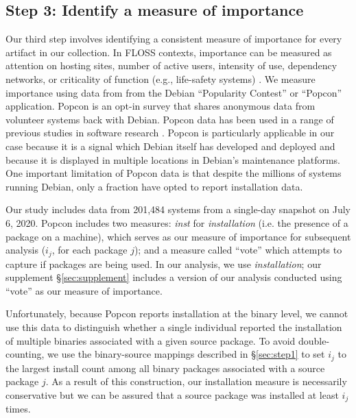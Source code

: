 \documentclass[10pt,conference]{IEEEtran}\usepackage[]{graphicx}\usepackage[usenames,dvipsnames]{color}
\begin{document}
\subsection{Step 3: Identify a measure of importance}
\label{sec:step3}

Our third step involves identifying a consistent measure of importance for every artifact in our collection.
In FLOSS contexts, importance can be measured as attention on hosting sites, number of active users, intensity of use, dependency networks, or criticality of function (e.g., life-safety systems) \cite{boldyreff_heartbeat:_2009, eghbal_working_2020, stergiopoulos_time-based_2016}.
We measure importance using data from from the Debian ``Popularity Contest'' or ``Popcon'' application. Popcon is an opt-in survey that shares anonymous data from volunteer systems back with Debian.  Popcon data has been used in a range of previous studies in software research \cite{boldyreff_heartbeat:_2009, herraiz_impact_2011, davies_perspectives_2010}. 
Popcon is particularly applicable in our case because it is a signal which Debian itself has developed and deployed and because it is displayed in multiple locations in Debian's maintenance platforms. 
One important limitation of Popcon data is that despite the millions of systems running Debian, only a fraction have opted to report installation data. 

Our study includes data from 201,484 systems from a single-day snapshot on July 6, 2020.  Popcon includes two measures: \textit{inst} for \textit{installation} (i.e. the presence of a package on a machine), which serves as our measure of importance for subsequent analysis ($i_j$, for each package $j$); 
and a measure called ``vote'' which attempts to capture if packages are being used. In our analysis, we use \textit{installation}; our supplement  §\ref{sec:supplement} includes a version of our analysis conducted using ``vote'' as our measure of importance. 

Unfortunately, because Popcon reports installation at the binary level, we cannot use this data to distinguish whether a single individual reported the installation of multiple binaries associated with a given source package. To avoid double-counting, we use the binary-source mappings described in §\ref{sec:step1} to set $i_j$ to the largest install count among all binary packages associated with a source package $j$. As a result of this construction, our installation measure is necessarily conservative but we can be assured that a source package was installed at least $i_j$ times.
\end{document}
